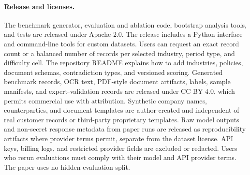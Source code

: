 \paragraph{Release and licenses.}
The benchmark generator, evaluation and ablation code, bootstrap analysis tools, and tests are released under Apache-2.0. The release includes a Python interface and command-line tools for custom datasets. Users can request an exact record count or a balanced number of records per selected industry, period type, and difficulty cell. The repository README explains how to add industries, policies, document schemas, contradiction types, and versioned scoring. Generated benchmark records, OCR text, PDF-style document artifacts, labels, sample manifests, and expert-validation records are released under CC BY 4.0, which permits commercial use with attribution. Synthetic company names, counterparties, and document templates are author-created and independent of real customer records or third-party proprietary templates. Raw model outputs and non-secret response metadata from paper runs are released as reproducibility artifacts where provider terms permit, separate from the dataset license. API keys, billing logs, and restricted provider fields are excluded or redacted. Users who rerun evaluations must comply with their model and API provider terms. The paper uses no hidden evaluation split.
